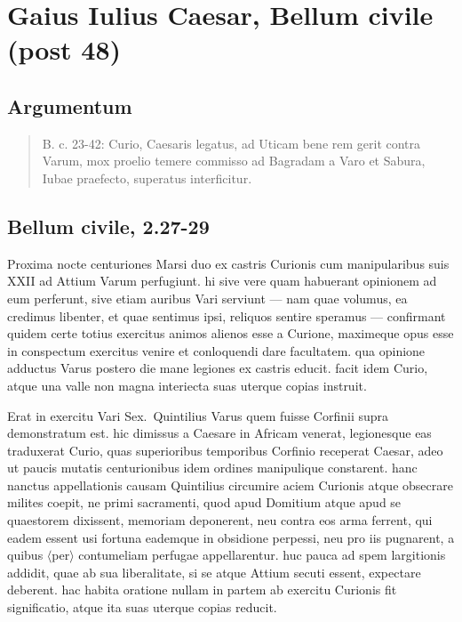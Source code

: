 



\section*{Gaius Iulius Caesar, Bellum civile (post 48)}

\subsection*{Argumentum}
\begin{quotation}

\noindent B. c. 23-42: Curio, Caesaris legatus, ad Uticam bene rem gerit contra Varum, mox proelio temere commisso ad Bagradam a Varo et Sabura, Iubae praefecto, superatus interficitur.
\end{quotation}

\subsection*{Bellum civile, 2.27-29}

Proxima nocte centuriones Marsi duo ex castris Curionis cum manipularibus suis XXII ad Attium Varum perfugiunt. hi sive vere quam habuerant opinionem ad eum perferunt, sive etiam auribus Vari serviunt — nam quae volumus, ea credimus libenter, et quae sentimus ipsi, reliquos sentire speramus — confirmant quidem certe totius exercitus animos alienos esse a Curione, maximeque opus esse in conspectum exercitus venire et conloquendi dare facultatem. qua opinione adductus Varus postero die mane legiones ex castris educit. facit idem Curio, atque una valle non magna interiecta suas uterque copias instruit. 

Erat in exercitu Vari Sex.\ Quintilius Varus quem fuisse Corfinii supra demonstratum est. hic dimissus a Caesare in Africam venerat, legionesque eas traduxerat Curio, quas superioribus temporibus Corfinio receperat Caesar, adeo ut paucis mutatis centurionibus idem ordines manipulique constarent. hanc nanctus appellationis causam Quintilius circumire aciem Curionis atque obsecrare milites coepit, ne primi sacramenti, quod apud Domitium atque apud se quaestorem dixissent, memoriam deponerent, neu contra eos arma ferrent, qui eadem essent usi fortuna eademque in obsidione perpessi, neu pro iis pugnarent, a quibus $\langle$per$\rangle$ contumeliam perfugae appellarentur. huc pauca ad spem largitionis addidit, quae ab sua liberalitate, si se atque Attium secuti essent, expectare deberent. hac habita oratione nullam in partem ab exercitu Curionis fit significatio, atque ita suas uterque copias reducit.
	
